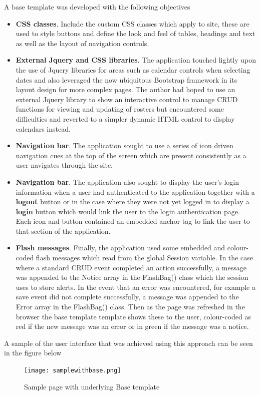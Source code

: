 \documentclass[a4paper,Times New Roman 11pt]{article}
\begin{document}
A base template was developed with the following objectives
\begin {itemize}

\item \textbf{CSS classes}. Include the custom CSS classes which apply to site, these are used to style buttons and define the look and feel of tables, headings and text as well as the layout of navigation controls.
\item \textbf{External Jquery and CSS libraries}.  The application touched lightly upon the use of Jquery libraries for areas such as calendar controls when selecting dates and also leveraged the now ubiquitous Bootstrap framework in its layout design for more complex pages. The author had hoped to use an external Jquery library to show an interactive control to manage CRUD functions for viewing and updating of rosters but encountered some difficulties and reverted to a simpler dynamic HTML control to display calendars instead.
\item \textbf{Navigation bar}.  The application sought to use a series of icon driven navigation cues at the top of the screen which are present consistently as a user navigates through the site.
\item \textbf{Navigation bar}.  The application also sought to display the user's login information when a user had authenticated to the application together with a \textbf{logout} button or in the case where they were not yet logged in to display a \textbf{login} button which would link the user to the login authentication page. Each icon and button contained an embedded anchor tag to link the user to that section of the application.
\item \textbf{Flash messages}.  Finally, the application used some embedded and colour-coded flash messages which read from the global Session variable. In the case where a standard CRUD event completed an action successfully, a message was appended to the Notice array in the FlashBag() class which the session uses to store alerts. In the event that an error was encountered, for example a save event did not complete successfully, a message was appended to the Error array in the FlashBag() class. Then as the page was refreshed in the browser the base template template shows these to the user, colour-coded as red if the new message was an error or in green if the message was a notice.
 
\end {itemize}

A sample of the user interface that was achieved using this approach can be seen in the figure below
 \begin{figure}[h!]
\texttt{[image: samplewithbase.png]}
  \caption{Sample page with underlying Base template}
  \label{fig:Sample page with underlying Base template}
\end{figure}
\end{document}
